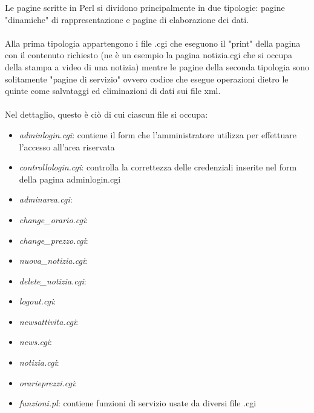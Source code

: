 \documentclass[12pt]{article}
\begin{document}
				  Le pagine scritte in Perl si dividono principalmente in due tipologie: pagine "dinamiche" di rappresentazione e pagine di elaborazione dei dati.\\ \\
				Alla prima tipologia appartengono i file .cgi che eseguono il "print" della pagina con il contenuto richiesto (ne \`e un esempio la pagina notizia.cgi che si occupa della stampa a video di una notizia) mentre le pagine della seconda tipologia sono solitamente "pagine di servizio" ovvero codice che esegue operazioni dietro le quinte come salvataggi ed eliminazioni di dati sui file xml. \\ \\Nel dettaglio, questo \`e ci\`o di cui ciascun file si occupa:
\begin{itemize}
\item \textit{adminlogin.cgi}: contiene il form che l'amministratore utilizza per effettuare l'accesso all'area riservata
\item \textit{controllologin.cgi}: controlla la correttezza delle credenziali inserite nel form della pagina adminlogin.cgi
\item \textit{adminarea.cgi}: 
\item \textit{change\_orario.cgi}: 
\item \textit{change\_prezzo.cgi}: 
\item \textit{nuova\_notizia.cgi}: 
\item \textit{delete\_notizia.cgi}: 
\item \textit{logout.cgi}: 
\item \textit{newsattivita.cgi}: 
\item \textit{news.cgi}: 
\item \textit{notizia.cgi}: 
\item \textit{orarieprezzi.cgi}: 
\item \textit{funzioni.pl}: contiene funzioni di servizio usate da diversi file .cgi
\end{itemize}	
			
		\newpage	
\end{document}
